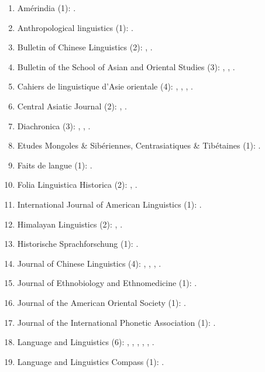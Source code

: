 \documentclass[oneside,a4paper,11pt]{article}
\begin{document}
 \begin{enumerate}
 \item Amérindia (1): \cite{jacques12bear}.
 \item Anthropological linguistics (1): \cite{japhug14ideophones}.
 \item Bulletin of Chinese Linguistics (2): \cite{jacques15derivational.khaling}, \cite{jacques16ssuffixes}.
 \item Bulletin of the School of Asian and Oriental Studies (3):  \cite{jacques10refl}, \cite{rg-gj12yod}, \cite{jacques13yod}.
 \item Cahiers de linguistique d'Asie orientale (4): \cite{jacques00ywij},  \cite{jacques03dissimilation},   \cite{jacques07chang},  \cite{michaud10bonin}.
 \item Central Asiatic Journal (2):  \cite{jacques10imperial}, \cite{jacques14ergative}.
  \item Diachronica (3): \cite{jacques.michaud11naish}, \cite{michaud-jacques12nasalite}, \cite{jacques16comparative}.
  \item Etudes Mongoles \& Sibériennes, Centrasiatiques \& Tibétaines (1):  \cite{jacques09e}.
  \item Faits de langue (1): \cite{jacques07redupl}.
 \item Folia Linguistica Historica (2): \cite{jacques13arapaho}, \cite{jacques15causative}.
 \item International Journal of American Linguistics (1): \cite{jacques16ebde}.
 \item Himalayan Linguistics (2): \cite{jacques10zos},  \cite{jacques14rtau}.
 \item Historische Sprachforschung (1): \cite{jacques15cochon}.
 \item Journal of Chinese Linguistics (4):   \cite{jacques11tangut.verb}, \cite{jacques15sr}, \cite{jacques16relatives}, \cite{jacques17buyang}.
 \item Journal of Ethnobiology and Ethnomedicine (1): \cite{Kang2016}.
 \item Journal of the American Oriental Society (1): \cite{jacques11ngwemi}.
 \item Journal of the International Phonetic Association (1): \cite{jacques17ipa}.
   \item Language and Linguistics (6):  \cite{jacques07passif}, \cite{jacques09tangutverb}, \cite{jacques10inverse},     \cite{jacques11pumi.tone}, \cite{jacques12agreement},    \cite{jacques12khaling}.  
   \item  Language and Linguistics Compass (1): \cite{jacques14inverse}.   

\end{enumerate}
\end{document}
